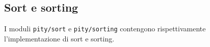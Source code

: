 \subsection{Sort e sorting}

I moduli \lstinline{pity/sort} e \lstinline{pity/sorting} contengono
rispettivamente l'implementazione di sort e sorting.




